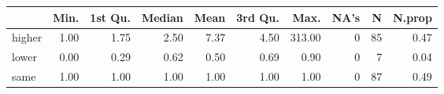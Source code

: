 \begin{table}[ht]
\centering
\begin{tabular}{lrrrrrrrrr}
  \hline
 & Min. & 1st Qu. & Median & Mean & 3rd Qu. & Max. & NA's & N & N.prop \\ 
  \hline
higher & 1.00 & 1.75 & 2.50 & 7.37 & 4.50 & 313.00 &   0 &  85 & 0.47 \\ 
  lower & 0.00 & 0.29 & 0.62 & 0.50 & 0.69 & 0.90 &   0 &   7 & 0.04 \\ 
  same & 1.00 & 1.00 & 1.00 & 1.00 & 1.00 & 1.00 &   0 &  87 & 0.49 \\ 
   \hline
\end{tabular}
\end{table}
